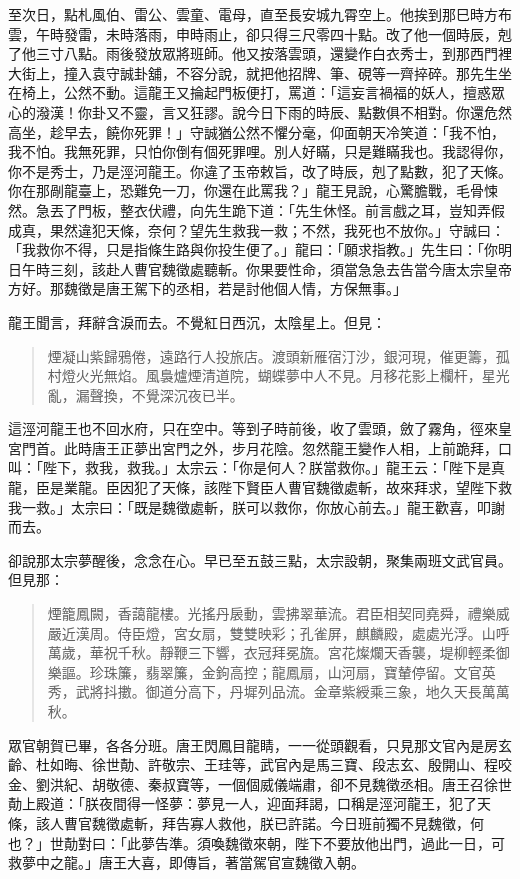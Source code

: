 至次日，點札風伯、雷公、雲童、電母，直至長安城九霄空上。他挨到那巳時方布雲，午時發雷，未時落雨，申時雨止，卻只得三尺零四十點。改了他一個時辰，剋了他三寸八點。雨後發放眾將班師。他又按落雲頭，還變作白衣秀士，到那西門裡大街上，撞入袁守誠卦舖，不容分說，就把他招牌、筆、硯等一齊捽碎。那先生坐在椅上，公然不動。這龍王又掄起門板便打，罵道：「這妄言禍福的妖人，擅惑眾心的潑漢！你卦又不靈，言又狂謬。說今日下雨的時辰、點數俱不相對。你還危然高坐，趁早去，饒你死罪！」守誠猶公然不懼分毫，仰面朝天冷笑道：「我不怕，我不怕。我無死罪，只怕你倒有個死罪哩。別人好瞞，只是難瞞我也。我認得你，你不是秀士，乃是涇河龍王。你違了玉帝敕旨，改了時辰，剋了點數，犯了天條。你在那剮龍臺上，恐難免一刀，你還在此罵我？」龍王見說，心驚膽戰，毛骨悚然。急丟了門板，整衣伏禮，向先生跪下道：「先生休怪。前言戲之耳，豈知弄假成真，果然違犯天條，奈何？望先生救我一救；不然，我死也不放你。」守誠曰：「我救你不得，只是指條生路與你投生便了。」龍曰：「願求指教。」先生曰：「你明日午時三刻，該赴人曹官魏徵處聽斬。你果要性命，須當急急去告當今唐太宗皇帝方好。那魏徵是唐王駕下的丞相，若是討他個人情，方保無事。」

龍王聞言，拜辭含淚而去。不覺紅日西沉，太陰星上。但見：
\begin{quote}
煙凝山紫歸鴉倦，遠路行人投旅店。渡頭新雁宿汀沙，銀河現，催更籌，孤村燈火光無焰。風裊爐煙清道院，蝴蝶夢中人不見。月移花影上欄杆，星光亂，漏聲換，不覺深沉夜已半。
\end{quote}

這涇河龍王也不回水府，只在空中。等到子時前後，收了雲頭，斂了霧角，徑來皇宮門首。此時唐王正夢出宮門之外，步月花陰。忽然龍王變作人相，上前跪拜，口叫：「陛下，救我，救我。」太宗云：「你是何人？朕當救你。」龍王云：「陛下是真龍，臣是業龍。臣因犯了天條，該陛下賢臣人曹官魏徵處斬，故來拜求，望陛下救我一救。」太宗曰：「既是魏徵處斬，朕可以救你，你放心前去。」龍王歡喜，叩謝而去。

卻說那太宗夢醒後，念念在心。早已至五鼓三點，太宗設朝，聚集兩班文武官員。但見那：
\begin{quote}
煙籠鳳闕，香藹龍樓。光搖丹扆動，雲拂翠華流。君臣相契同堯舜，禮樂威嚴近漢周。侍臣燈，宮女扇，雙雙映彩；孔雀屏，麒麟殿，處處光浮。山呼萬歲，華祝千秋。靜鞭三下響，衣冠拜冕旒。宮花燦爛天香襲，堤柳輕柔御樂謳。珍珠簾，翡翠簾，金鉤高控；龍鳳扇，山河扇，寶輦停留。文官英秀，武將抖擻。御道分高下，丹墀列品流。金章紫綬乘三象，地久天長萬萬秋。
\end{quote}

眾官朝賀已畢，各各分班。唐王閃鳳目龍睛，一一從頭觀看，只見那文官內是房玄齡、杜如晦、徐世勣、許敬宗、王珪等，武官內是馬三寶、段志玄、殷開山、程咬金、劉洪紀、胡敬德、秦叔寶等，一個個威儀端肅，卻不見魏徵丞相。唐王召徐世勣上殿道：「朕夜間得一怪夢：夢見一人，迎面拜謁，口稱是涇河龍王，犯了天條，該人曹官魏徵處斬，拜告寡人救他，朕已許諾。今日班前獨不見魏徵，何也？」世勣對曰：「此夢告準。須喚魏徵來朝，陛下不要放他出門，過此一日，可救夢中之龍。」唐王大喜，即傳旨，著當駕官宣魏徵入朝。


